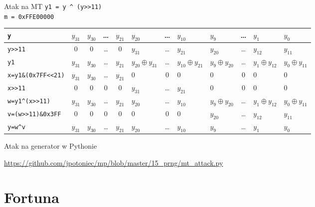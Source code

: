 \documentclass{mp}
\newcommand{\xor}{\oplus}
\begin{document}
\begin{frame}{Atak na MT}
\texttt{y1 = y \^{} (y>>11)} \\
\texttt{m = 0xFFE00000} \\
\setlength\tabcolsep{3pt}
\small
\begin{tabular}{l||c|c|c|c|p{.8cm}|c|p{.8cm}|p{.8cm}|c|p{.8cm}|p{.8cm}|}
\hline
\texttt{y} & $y_{31}$ & $y_{30}$ & \ldots & $y_{21}$ & $y_{20}$ & \ldots & $y_{10}$ & $y_9$ & \ldots & $y_1$ & $y_0$ \pause\\
\hline
\texttt{y>>11} & 0 & 0 & \ldots & 0 & $y_{31}$ & \ldots & $y_{21}$ & $y_{20}$ & \ldots & $y_{12}$ & $y_{11}$ \pause\\
\hline
\texttt{y1} & $y_{31}$ & $y_{30}$ & \ldots & $y_{21}$ & $y_{20}\xor y_{31}$ & \ldots & $y_{10}\xor y_{21}$ & $y_9\xor y_{20}$ & \ldots & $y_1\xor y_{12}$ & $y_0\xor y_{11}$ \pause\\
\hline
\hline
\texttt{x=y1\&(0x7FF<<21)} & $y_{31}$ & $y_{30}$ & \ldots & $y_{21}$ & 0 & 0 & 0 & 0 & 0 & 0 & 0 \pause\\
\hline
\texttt{x>>11} & 0 & 0 & 0 & 0 & $y_{31}$ & \ldots & $y_{21}$ & 0 & 0 & 0 & 0  \pause\\
\hline
\texttt{w=y1\^{}(x>>11)} & $y_{31}$ & $y_{30}$ & \ldots & $y_{21}$ & $y_{20}$ & \ldots & $y_{10}$ & $y_9\xor y_{20}$ & \ldots & $y_1\xor y_{12}$ & $y_0\xor y_{11}$ \pause\\
\hline
\texttt{v=(w>>11)\&0x3FF} & 0 & 0 & 0 & 0 & 0 & 0 & 0 & $y_{20}$ & \ldots & $y_{12}$ &
 $y_{11}$ \pause\\
\hline
\texttt{y=w\^{}v} & $y_{31}$ & $y_{30}$ & \ldots & $y_{21}$ & $y_{20}$ & \ldots & $y_{10}$ & $y_9$ & \ldots & $y_1$ & $y_0$ \pause\\
\hline
\end{tabular}
\end{frame}
\begin{frame}{Atak na generator w Pythonie}

{\small \url{https://github.com/jpotoniec/mp/blob/master/15_prng/mt_attack.py}}
\end{frame}

\section{Fortuna}
\end{document}
